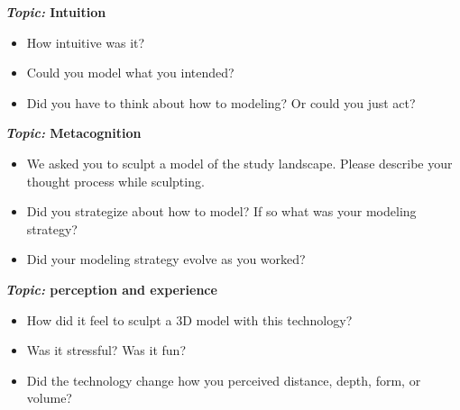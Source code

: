\documentclass[Afour,sagev,times]{sagej} %
\begin{document}
\begin{sm}
\textbf{\emph{Topic:} Intuition}
\begin{itemize}
\item How intuitive was it? 
\item Could you model what you intended?
\item Did you have to think about how to modeling? Or could you just act?
\end{itemize}

\textbf{\emph{Topic:} Metacognition}
\begin{itemize}
\item We asked you to sculpt a model of the study landscape. Please describe your thought process while sculpting. 
\item Did you strategize about how to model? If so what was your modeling strategy? 
\item Did your modeling strategy evolve as you worked?
\end{itemize}

\textbf{\emph{Topic:} perception and experience}
\begin{itemize}
\item How did it feel to sculpt a 3D model with this technology?
\item Was it stressful? Was it fun?
\item Did the technology change how you perceived distance, depth, form, or volume?  
\end{itemize}

\end{sm}



 
\end{document}
